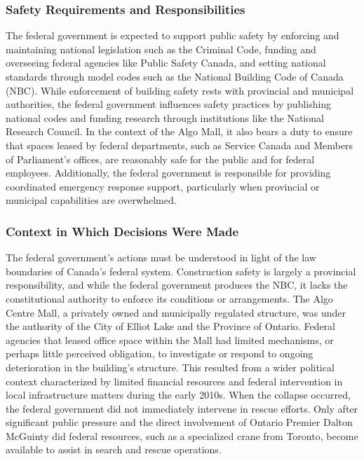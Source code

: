 \documentclass[12pt]{article}
\begin{document}
\subsubsection*{Safety Requirements and Responsibilities}
The federal government is expected to support public safety by enforcing and maintaining national legislation such as the Criminal Code, funding and overseeing federal agencies like Public Safety Canada, and setting national standards through model codes such as the National Building Code of Canada (NBC). While enforcement of building safety rests with provincial and municipal authorities, the federal government influences safety practices by publishing national codes and funding research through institutions like the National Research Council. In the context of the Algo Mall, it also bears a duty to ensure that spaces leased by federal departments, such as Service Canada and Members of Parliament’s offices, are reasonably safe for the public and for federal employees. Additionally, the federal government is responsible for providing coordinated emergency response support, particularly when provincial or municipal capabilities are overwhelmed.

\subsubsection*{Context in Which Decisions Were Made}
The federal government’s actions must be understood in light of the law boundaries of Canada’s federal system. Construction safety is largely a provincial responsibility, and while the federal government produces the NBC, it lacks the constitutional authority to enforce its conditions or arrangements. The Algo Centre Mall, a privately owned and municipally regulated structure, was under the authority of the City of Elliot Lake and the Province of Ontario. Federal agencies that leased office space within the Mall had limited mechanisms, or perhaps little perceived obligation, to investigate or respond to ongoing deterioration in the building’s structure. This resulted from a wider political context characterized by limited financial resources and federal intervention in local infrastructure matters during the early 2010s. When the collapse occurred, the federal government did not immediately intervene in rescue efforts. Only after significant public pressure and the direct involvement of Ontario Premier Dalton McGuinty did federal resources, such as a specialized crane from Toronto, become available to assist in search and rescue operations.
\end{document}
